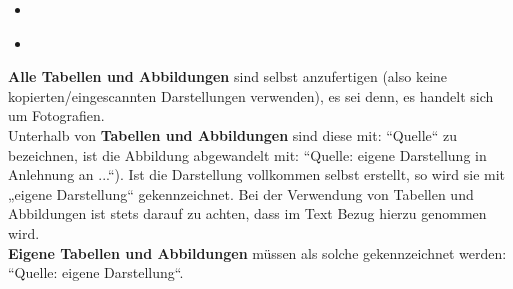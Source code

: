 \documentclass[%
	BCOR=8.25mm,         %
	DIV=12,              %
	parskip=half,		 %
	toc=bibliography,	 %
	headsepline=on,      %
	oneside,
	toc=listof,
	toc=index,
	enabledeprecatedfontcommands,
	]{scrbook}
\begin{document}
\begin{itemize}
	\item \cite[vgl.][S. 130]{Delfmann2015DMQL} 
	\item \cite[vgl.][S. 500]{Delfmann2015GMQL}
\end{itemize}
\textbf{Alle Tabellen und Abbildungen} sind selbst anzufertigen (also keine kopierten/eingescannten Darstellungen verwenden), es sei denn, es handelt sich um Fotografien. \\
Unterhalb von \textbf{Tabellen und Abbildungen} sind diese mit: ``Quelle`` { zu} bezeichnen, ist die Abbildung abgewandelt mit: ``Quelle: eigene Darstellung in Anlehnung an ...``). Ist die Darstellung vollkommen selbst erstellt, so wird sie mit „eigene Darstellung“ gekennzeichnet. Bei der Verwendung von Tabellen und Abbildungen ist stets darauf zu achten, dass im Text Bezug hierzu genommen wird.\\
\textbf{Eigene Tabellen und Abbildungen} m\"ussen als solche gekennzeichnet werden: ``Quelle: eigene Darstellung``.

{}
\end{document}
